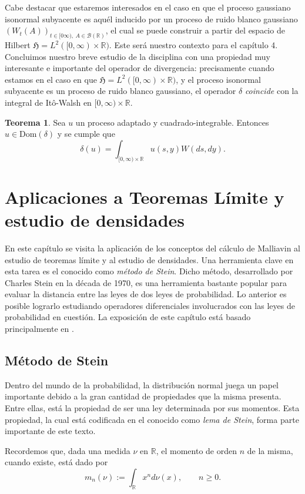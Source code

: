 \documentclass[letterpaper,twoside,12pt]{book}
\newcommand{\R}{\mathbb{R}}
\newcommand{\B}{\mathcal{B}}
\newcommand{\1}{\mathds{1}}
\theoremstyle{definition}
\theoremstyle{definition}
\newtheorem{teo}{Teorema}
\theoremstyle{remark}
\theoremstyle{definition}
\theoremstyle{definition}
\theoremstyle{definition}
\theoremstyle{definition}
\theoremstyle{definition}
\begin{document}
Cabe destacar que estaremos interesados en el caso en que el proceso gaussiano isonormal subyacente es aquél inducido por un proceso de ruido blanco gaussiano $(W_t(A))_{t\in [0\infty), \ A\in \B(\R)}$, el cual se puede construir a partir del espacio de Hilbert $\mathfrak{H}=L^{2}([0,\infty)\times \R)$. Este será nuestro contexto para el capítulo 4. Concluimos nuestro breve estudio de la disciplina con una propiedad muy interesante e importante del operador de divergencia: precisamente cuando estamos en el caso en que $\mathfrak{H}=L^2([0,\infty)\times\R)$, y el proceso isonormal subyacente es un proceso de ruido blanco gaussiano, el operador $\delta$ \textit{coincide} con la integral de Itô-Walsh en $[0,\infty)\times\R$.

\begin{teo} 
 Sea $u$ un proceso adaptado y cuadrado-integrable. Entonces $u\in \text{Dom}(\delta)$ y se cumple que 
 \[
 \delta(u)=\int_{[0,\infty)\times \R}^{}u(s,y)W(ds,dy).
 \]
 \end{teo}
 
 \chapter{Aplicaciones a Teoremas Límite y estudio de densidades}
En este capítulo se visita la aplicación de los conceptos del cálculo de Malliavin al estudio de teoremas límite y al estudio de densidades. 
Una herramienta clave en esta tarea es el conocido como \textit{método de Stein}. 
Dicho método, desarrollado por Charles Stein en la década de 1970, es una herramienta bastante popular para evaluar la distancia entre las leyes de dos leyes de probabilidad. Lo anterior es posible lograrlo estudiando operadores diferenciales involucrados con las leyes de probabilidad en cuestión. La exposición de este capítulo está basado principalmente en \cite[capitulo 4]{Nourdin_Peccati_2012}. 

\section{Método de Stein}

Dentro del mundo de la probabilidad, la distribución normal juega un papel importante debido a la gran cantidad de propiedades que la misma presenta. Entre ellas, está la propiedad de ser una ley determinada por sus momentos. Esta propiedad, la cual está codificada en el conocido como \textit{lema de Stein}, forma parte importante de este texto. 

Recordemos que, dada una medida $\nu$ en $\R$, el momento de orden $n$ de la misma, cuando existe, está dado por 
\[
   m_n(\nu):=\int_{\R}x^{n}d\nu(x), \qquad n\geq0.
\]
\end{document}
